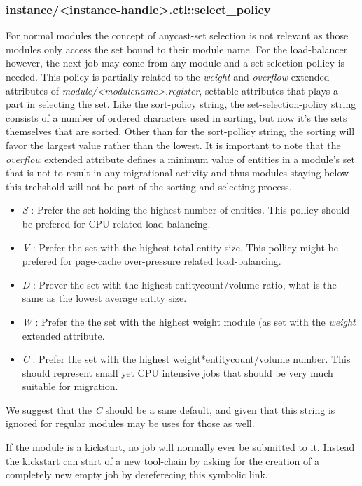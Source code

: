 \subsubsection{instance/<instance-handle>.ctl::select\_policy}
For normal modules the concept of anycast-set selection is not relevant as those modules only access the set bound to their module name. For the load-balancer however, the next job may come from any module and a set selection pollicy is needed. This policy is partially related to the \emph{weight} and \emph{overflow} extended attributes of \emph{module/<modulename>.register}, settable attributes that plays a part in selecting the set. Like the sort-policy string, the set-selection-policy string consists of a number of ordered characters used in sorting, but now it's the sets themselves that are sorted. Other than for the sort-pollicy string, the sorting will favor the largest value rather than the lowest. It is important to note that the \emph{overflow} extended attribute defines a minimum value of entities in a module's set that is not to result in any migrational activity and thus modules staying below this trehshold will not be part of the sorting and selecting process.
\begin{itemize}
\item \emph{S} : Prefer the set holding the highest number of entities. This pollicy should be prefered for CPU related load-balancing.
\item \emph{V} : Prefer the set with the highest total entity size. This pollicy might be prefered for page-cache over-pressure related load-balancing.
\item \emph{D} : Prever the set with the highest entitycount/volume ratio, what is the same as the lowest average entity size. 
\item \emph{W} : Prefer the the set with the highest weight module (as set with the \emph{weight} extended attribute.
\item \emph{C} : Prefer the set with the highest weight*entitycount/volume number. This should represent small yet CPU intensive jobs that should be very much suitable for migration. 
\end{itemize} 
We suggest that the \emph{C} should be a sane default, and given that this string is ignored for regular modules may be uses for those as well.  

If the module is a kickstart, no job will normally ever be submitted to it. Instead the kickstart can start of a new tool-chain by asking for the creation of a completely new empty job by dereferecing this symbolic link.
